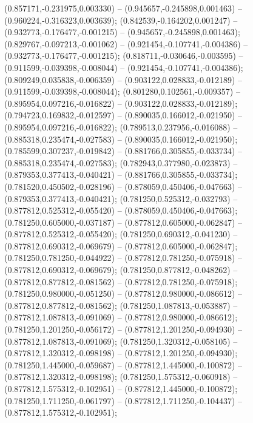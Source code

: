  (0.857171,-0.231975,0.003330) -- (0.945657,-0.245898,0.001463) -- (0.960224,-0.316323,0.003639);
 (0.842539,-0.164202,0.001247) -- (0.932773,-0.176477,-0.001215) -- (0.945657,-0.245898,0.001463);
 (0.829767,-0.097213,-0.001062) -- (0.921454,-0.107741,-0.004386) -- (0.932773,-0.176477,-0.001215);
 (0.818711,-0.030646,-0.003595) -- (0.911599,-0.039398,-0.008044) -- (0.921454,-0.107741,-0.004386);
 (0.809249,0.035838,-0.006359) -- (0.903122,0.028833,-0.012189) -- (0.911599,-0.039398,-0.008044);
 (0.801280,0.102561,-0.009357) -- (0.895954,0.097216,-0.016822) -- (0.903122,0.028833,-0.012189);
 (0.794723,0.169832,-0.012597) -- (0.890035,0.166012,-0.021950) -- (0.895954,0.097216,-0.016822);
 (0.789513,0.237956,-0.016088) -- (0.885318,0.235474,-0.027583) -- (0.890035,0.166012,-0.021950);
 (0.785599,0.307237,-0.019842) -- (0.881766,0.305855,-0.033734) -- (0.885318,0.235474,-0.027583);
 (0.782943,0.377980,-0.023873) -- (0.879353,0.377413,-0.040421) -- (0.881766,0.305855,-0.033734);
 (0.781520,0.450502,-0.028196) -- (0.878059,0.450406,-0.047663) -- (0.879353,0.377413,-0.040421);
 (0.781250,0.525312,-0.032793) -- (0.877812,0.525312,-0.055420) -- (0.878059,0.450406,-0.047663);
 (0.781250,0.605000,-0.037187) -- (0.877812,0.605000,-0.062847) -- (0.877812,0.525312,-0.055420);
 (0.781250,0.690312,-0.041230) -- (0.877812,0.690312,-0.069679) -- (0.877812,0.605000,-0.062847);
 (0.781250,0.781250,-0.044922) -- (0.877812,0.781250,-0.075918) -- (0.877812,0.690312,-0.069679);
 (0.781250,0.877812,-0.048262) -- (0.877812,0.877812,-0.081562) -- (0.877812,0.781250,-0.075918);
 (0.781250,0.980000,-0.051250) -- (0.877812,0.980000,-0.086612) -- (0.877812,0.877812,-0.081562);
 (0.781250,1.087813,-0.053887) -- (0.877812,1.087813,-0.091069) -- (0.877812,0.980000,-0.086612);
 (0.781250,1.201250,-0.056172) -- (0.877812,1.201250,-0.094930) -- (0.877812,1.087813,-0.091069);
 (0.781250,1.320312,-0.058105) -- (0.877812,1.320312,-0.098198) -- (0.877812,1.201250,-0.094930);
 (0.781250,1.445000,-0.059687) -- (0.877812,1.445000,-0.100872) -- (0.877812,1.320312,-0.098198);
 (0.781250,1.575312,-0.060918) -- (0.877812,1.575312,-0.102951) -- (0.877812,1.445000,-0.100872);
 (0.781250,1.711250,-0.061797) -- (0.877812,1.711250,-0.104437) -- (0.877812,1.575312,-0.102951);
